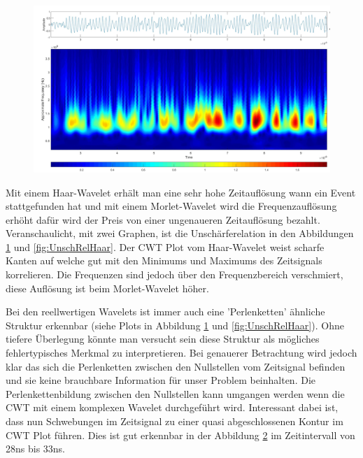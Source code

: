 \begin{refsection}
\begin{figure}
	\label{fig:UnschRelMorl}
\end{figure}
\begin{figure}
	\centering
	\includegraphics[width=1\linewidth]{papers/gis/Bilder/cgau5}
	\label{fig:cgau5}
\end{figure}

Mit einem Haar-Wavelet erhält man eine sehr hohe Zeitauflösung wann ein Event stattgefunden hat und mit einem Morlet-Wavelet wird die Frequenzauflösung erhöht dafür wird der Preis von einer ungenaueren Zeitauflösung bezahlt.
Veranschaulicht, mit zwei Graphen, ist die Unschärferelation in den Abbildungen \ref{fig:UnschRelMorl} und \ref{fig:UnschRelHaar}. 
Der CWT Plot vom Haar-Wavelet weist scharfe Kanten auf welche gut mit den Minimums und Maximums des Zeitsignals korrelieren.
Die Frequenzen sind jedoch über den Frequenzbereich verschmiert, diese Auflösung ist beim Morlet-Wavelet höher.

Bei den reellwertigen Wavelets ist immer auch eine 'Perlenketten' ähnliche Struktur erkennbar (siehe Plots in Abbildung \ref{fig:UnschRelMorl} und \ref{fig:UnschRelHaar}).
Ohne tiefere Überlegung könnte man versucht sein diese Struktur als mögliches fehlertypisches Merkmal zu interpretieren. 
Bei genauerer Betrachtung wird jedoch klar das sich die Perlenketten zwischen den Nullstellen vom Zeitsignal befinden und sie keine brauchbare Information für unser Problem beinhalten.
Die Perlenkettenbildung zwischen den Nullstellen kann umgangen werden wenn die CWT mit einem komplexen Wavelet durchgeführt wird.
Interessant dabei ist, dass nun Schwebungen im Zeitsignal zu einer quasi abgeschlossenen Kontur im CWT Plot führen.
Dies ist gut erkennbar in der Abbildung \ref{fig:cgau5} im Zeitintervall von 28ns bis 33ns.


\end{refsection}
